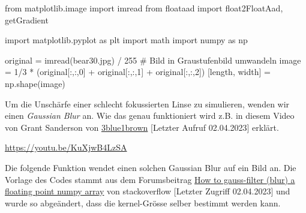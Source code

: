 \documentclass[
  a4paper,
  DIV=11]{scrreprt}
\newenvironment{Shaded}{\begin{snugshade}}{\end{snugshade}}
\newcommand{\CommentTok}[1]{\textcolor[rgb]{0.37,0.37,0.37}{#1}}
\newcommand{\DecValTok}[1]{\textcolor[rgb]{0.68,0.00,0.00}{#1}}
\newcommand{\ImportTok}[1]{\textcolor[rgb]{0.00,0.46,0.62}{#1}}
\newcommand{\NormalTok}[1]{\textcolor[rgb]{0.00,0.23,0.31}{#1}}
\newcommand{\OperatorTok}[1]{\textcolor[rgb]{0.37,0.37,0.37}{#1}}
\newcommand{\StringTok}[1]{\textcolor[rgb]{0.13,0.47,0.30}{#1}}
\theoremstyle{definition}
\theoremstyle{definition}
\theoremstyle{remark}
\begin{document}
\begin{Shaded}
\begin{Highlighting}[]
\ImportTok{from}\NormalTok{ matplotlib.image }\ImportTok{import}\NormalTok{ imread}
\ImportTok{from}\NormalTok{ floataad }\ImportTok{import}\NormalTok{ float2FloatAad, getGradient}

\ImportTok{import}\NormalTok{ matplotlib.pyplot }\ImportTok{as}\NormalTok{ plt}
\ImportTok{import}\NormalTok{ math}
\ImportTok{import}\NormalTok{ numpy }\ImportTok{as}\NormalTok{ np}

\NormalTok{original }\OperatorTok{=}\NormalTok{ imread(}\StringTok{\textquotesingle{}bear30.jpg\textquotesingle{}}\NormalTok{) }\OperatorTok{/} \DecValTok{255}
\CommentTok{\# Bild in Graustufenbild umwandeln}
\NormalTok{image }\OperatorTok{=} \DecValTok{1}\OperatorTok{/}\DecValTok{3} \OperatorTok{*}\NormalTok{ (original[:,:,}\DecValTok{0}\NormalTok{] }\OperatorTok{+}\NormalTok{ original[:,:,}\DecValTok{1}\NormalTok{] }\OperatorTok{+}\NormalTok{ original[:,:,}\DecValTok{2}\NormalTok{])}
\NormalTok{[length, width] }\OperatorTok{=}\NormalTok{ np.shape(image)}
\end{Highlighting}
\end{Shaded}

Um die Unschärfe einer schlecht fokussierten Linse zu simulieren, wenden
wir einen \emph{Gaussian Blur} an. Wie das genau funktioniert wird z.B.
in diesem Video von Grant Sanderson von
\href{https://www.3blue1brown.com}{3blue1brown} {[}Letzter Aufruf
02.04.2023{]} erklärt.

\url{https://youtu.be/KuXjwB4LzSA}

Die folgende Funktion wendet einen solchen Gaussian Blur auf ein Bild
an. Die Vorlage des Codes stammt aus dem Forumsbeitrag
\href{https://stackoverflow.com/questions/29920114/how-to-gauss-filter-blur-a-floating-point-numpy-array}{How
to gauss-filter (blur) a floating point numpy array} von stackoverflow
{[}Letzter Zugriff 02.04.2023{]} und wurde so abgeändert, dass die
kernel-Grösse selber bestimmt werden kann.
\end{document}
